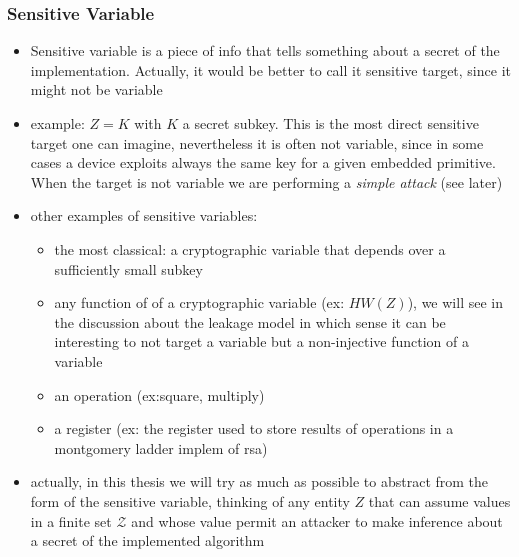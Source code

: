 \subsubsection{Sensitive Variable}
\begin{itemize}
\item Sensitive variable is a piece of info that tells something about a secret of the implementation. Actually, it would be better to call it sensitive target, since it might not be variable
\item example: $Z = K$ with $K$ a secret subkey. This is the most direct sensitive target one can imagine, nevertheless it is often not variable, since in some cases a device exploits always the same key for a given embedded primitive. When the target is not variable we are performing a \emph{simple attack} (see later)
\item other examples of sensitive variables: 
\begin{itemize}
\item the most classical: a cryptographic variable that depends over a sufficiently small subkey
\item any function of of a cryptographic variable (ex: $HW(Z)$), we will see in the discussion about the leakage model in which sense it can be interesting to not target a variable but a non-injective function of a variable
\item an operation (ex:square, multiply)
\item a register (ex: the register used to store results of operations in a montgomery ladder implem of rsa)
\end{itemize}
\item actually, in this thesis we will try as much as possible to abstract from the form of the sensitive variable, thinking of any entity $Z$ that can assume values in a finite set $\mathcal{Z}$ and whose value permit an attacker to make inference about a secret of the implemented algorithm
\end{itemize}
